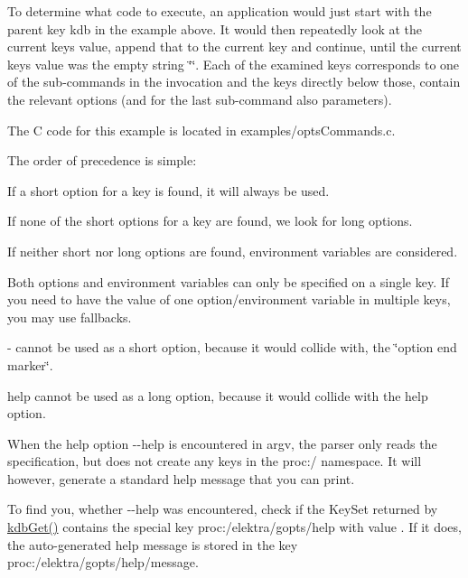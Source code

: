 To determine what code to execute, an application would just start with the parent key {\ttfamily kdb} in the example above. It would then repeatedly look at the current key\textquotesingle{}s value, append that to the current key and continue, until the current key\textquotesingle{}s value was the empty string {\ttfamily \char`\"{}\char`\"{}}. Each of the examined keys corresponds to one of the sub-\/commands in the invocation and the keys directly below those, contain the relevant options (and for the last sub-\/command also parameters).

The C code for this example is located in {\ttfamily examples/opts\+Commands.\+c}.

The order of precedence is simple\+:


\begin{DoxyItemize}
\item If a short option for a key is found, it will always be used.
\item If none of the short options for a key are found, we look for long options.
\item If neither short nor long options are found, environment variables are considered.
\end{DoxyItemize}


\begin{DoxyItemize}
\item Both options and environment variables can only be specified on a single key. If you need to have the value of one option/environment variable in multiple keys, you may use {\ttfamily fallback}s.
\item {\ttfamily -\/} cannot be used as a short option, because it would collide with, the \char`\"{}option end marker\char`\"{}.
\item {\ttfamily help} cannot be used as a long option, because it would collide with the help option.
\end{DoxyItemize}

When the help option {\ttfamily -\/-\/help} is encountered in {\ttfamily argv}, the parser only reads the specification, but does not create any keys in the {\ttfamily proc\+:/} namespace. It will however, generate a standard help message that you can print.

To find you, whether {\ttfamily -\/-\/help} was encountered, check if the Key\+Set returned by {\ttfamily \hyperlink{group__kdb_ga28e385fd9cb7ccfe0b2f1ed2f62453a1}{kdb\+Get()}} contains the special key {\ttfamily proc\+:/elektra/gopts/help} with value {}. If it does, the auto-\/generated help message is stored in the key {\ttfamily proc\+:/elektra/gopts/help/message}.


